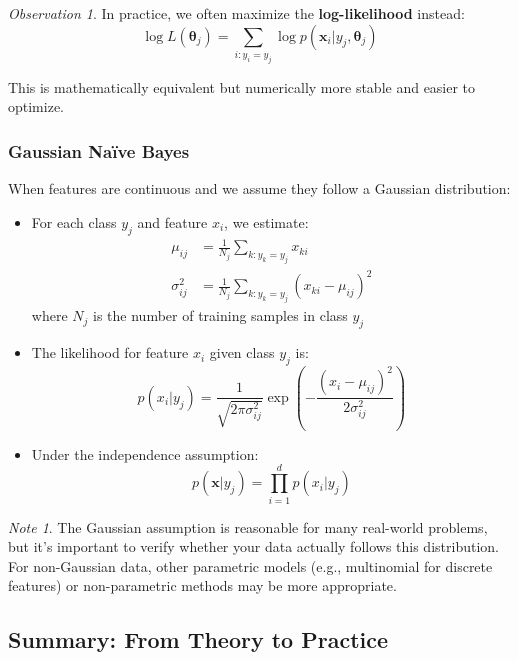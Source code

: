 \documentclass[11pt,a4paper]{article}
\theoremstyle{definition}
\theoremstyle{plain}
\theoremstyle{remark}
\newtheorem*{remark}{Note}
\newtheorem*{observation}{Observation}
\begin{document}
\begin{observation}
In practice, we often maximize the \textbf{log-likelihood} instead:
\[
\log L(\boldsymbol{\theta}_j) = \sum_{i: y_i = y_j} \log p(\mathbf{x}_i | y_j, \boldsymbol{\theta}_j)
\]

This is mathematically equivalent but numerically more stable and easier to optimize.
\end{observation}

\subsubsection{Gaussian Naïve Bayes}

When features are continuous and we assume they follow a Gaussian distribution:

\begin{itemize}
    \item For each class $y_j$ and feature $x_i$, we estimate:
    \begin{align}
    \mu_{ij} &= \frac{1}{N_j} \sum_{k: y_k = y_j} x_{ki} \\
    \sigma_{ij}^2 &= \frac{1}{N_j} \sum_{k: y_k = y_j} (x_{ki} - \mu_{ij})^2
    \end{align}
    where $N_j$ is the number of training samples in class $y_j$
    
    \item The likelihood for feature $x_i$ given class $y_j$ is:
    \[
    p(x_i | y_j) = \frac{1}{\sqrt{2\pi\sigma_{ij}^2}} \exp\left(-\frac{(x_i - \mu_{ij})^2}{2\sigma_{ij}^2}\right)
    \]
    
    \item Under the independence assumption:
    \[
    p(\mathbf{x} | y_j) = \prod_{i=1}^{d} p(x_i | y_j)
    \]
\end{itemize}

\begin{remark}
The Gaussian assumption is reasonable for many real-world problems, but it's important to verify whether your data actually follows this distribution. For non-Gaussian data, other parametric models (e.g., multinomial for discrete features) or non-parametric methods may be more appropriate.
\end{remark}

\subsection{Summary: From Theory to Practice}
\end{document}
